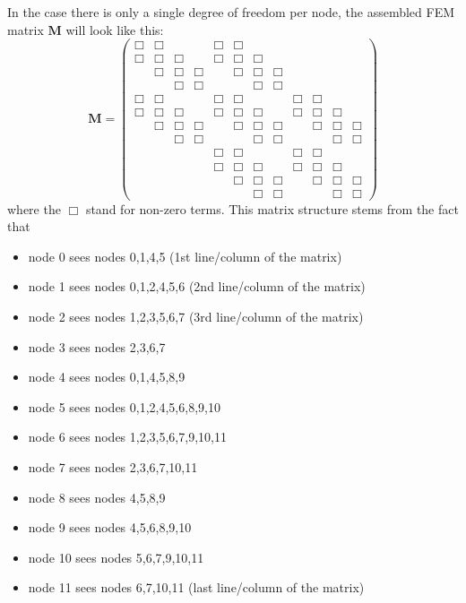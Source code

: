 \noindent In the case there is only a single degree of freedom per node, the 
assembled FEM matrix ${\bm M}$ will look like this:
\[
{\bm M}=
\left(
\begin{array}{cccccccccccc}
\Box & \Box &      &      & \Box & \Box &      &      &      &      &      &      \\
\Box & \Box & \Box &      & \Box & \Box & \Box &      &      &      &      &      \\
     & \Box & \Box & \Box &      & \Box & \Box & \Box &      &      &      &      \\
     &      & \Box & \Box &      &      & \Box & \Box &      &      &      &      \\
\Box & \Box &      &      & \Box & \Box &      &      & \Box & \Box &      &      \\
\Box & \Box & \Box &      & \Box & \Box & \Box &      & \Box & \Box & \Box &      \\
     & \Box & \Box & \Box &      & \Box & \Box & \Box &      & \Box & \Box & \Box \\
     &      & \Box & \Box &      &      & \Box & \Box &      &      & \Box & \Box \\
     &      &      &      & \Box & \Box &      &      & \Box & \Box &      &      \\
     &      &      &      & \Box & \Box & \Box &      & \Box & \Box & \Box &      \\
     &      &      &      &      & \Box & \Box & \Box &      & \Box & \Box & \Box \\
     &      &      &      &      &      & \Box & \Box &      &      & \Box & \Box 
\end{array}
\right)
\]
where the $\Box$ stand for non-zero terms.
This matrix structure stems from the fact that
\begin{itemize}
\item node 0 sees nodes 0,1,4,5 (1st line/column of the matrix)
\item node 1 sees nodes 0,1,2,4,5,6 (2nd line/column of the matrix)
\item node 2 sees nodes 1,2,3,5,6,7 (3rd line/column of the matrix)
\item node 3 sees nodes 2,3,6,7
\item node 4 sees nodes 0,1,4,5,8,9
\item node 5 sees nodes 0,1,2,4,5,6,8,9,10 
\item node 6 sees nodes 1,2,3,5,6,7,9,10,11
\item node 7 sees nodes 2,3,6,7,10,11
\item node 8 sees nodes 4,5,8,9
\item node 9 sees nodes 4,5,6,8,9,10
\item node 10 sees nodes 5,6,7,9,10,11 
\item node 11 sees nodes 6,7,10,11 (last line/column of the matrix)
\end{itemize}
